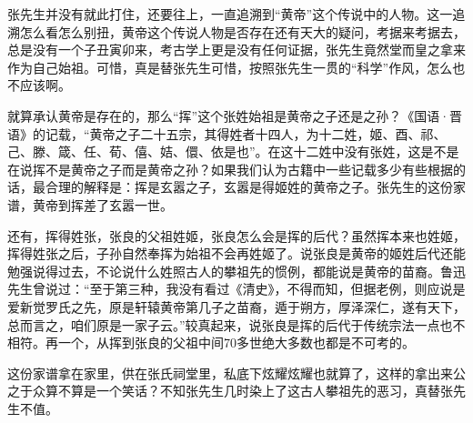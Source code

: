 张先生并没有就此打住，还要往上，一直追溯到“黄帝”这个传说中的人物。这一追溯怎么看怎么别扭，黄帝这个传说人物是否存在还有天大的疑问，考据来考据去，总是没有一个子丑寅卯来，考古学上更是没有任何证据，张先生竟然堂而皇之拿来作为自己始祖。可惜，真是替张先生可惜，按照张先生一贯的“科学”作风，怎么也不应该啊。

就算承认黄帝是存在的，那么“挥”这个张姓始祖是黄帝之子还是之孙？《国语·晋语》的记载，“黄帝之子二十五宗，其得姓者十四人，为十二姓，姬、酉、祁、己、滕、箴、任、荀、僖、姞、儇、依是也”。在这十二姓中没有张姓，这是不是在说挥不是黄帝之子而是黄帝之孙？如果我们认为古籍中一些记载多少有些根据的话，最合理的解释是：挥是玄嚣之子，玄嚣是得姬姓的黄帝之子。张先生的这份家谱，黄帝到挥差了玄嚣一世。

还有，挥得姓张，张良的父祖姓姬，张良怎么会是挥的后代？虽然挥本来也姓姬，挥得姓张之后，子孙自然奉挥为始祖不会再姓姬了。说张良是黄帝的姬姓后代还能勉强说得过去，不论说什么姓照古人的攀祖先的惯例，都能说是黄帝的苗裔。鲁迅先生曾说过：“至于第三种，我没有看过《清史》，不得而知，但据老例，则应说是爱新觉罗氏之先，原是轩辕黄帝第几子之苗裔，遁于朔方，厚泽深仁，遂有天下，总而言之，咱们原是一家子云。”较真起来，说张良是挥的后代于传统宗法一点也不相符。再一个，从挥到张良的父祖中间70多世绝大多数也都是不可考的。

这份家谱拿在家里，供在张氏祠堂里，私底下炫耀炫耀也就算了，这样的拿出来公之于众算不算是一个笑话？不知张先生几时染上了这古人攀祖先的恶习，真替张先生不值。